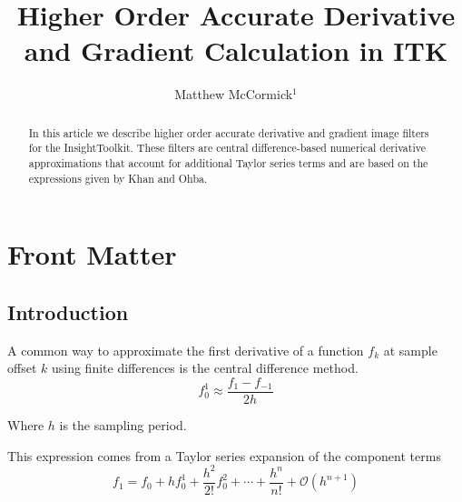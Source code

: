 \documentclass{InsightArticle}
\title{Higher Order Accurate Derivative and Gradient Calculation in ITK}
\author{Matthew McCormick$^{1}$}
\newcommand{\IJhandlerIDnumber}{9999}
\begin{document}
%
%
\IJhandlefooter{\IJhandlerIDnumber}


\ifpdf
\else
\fi


\maketitle


\ifhtml
\chapter*{Front Matter\label{front}}
\fi


\begin{abstract}
\noindent In this article we describe higher order accurate derivative and gradient
image filters for the InsightToolkit.  These filters are central difference-based
numerical derivative approximations that account for additional Taylor
series terms and are based on the expressions given by Khan and Ohba.
\end{abstract}

\IJhandlenote{\IJhandlerIDnumber}

\tableofcontents

\section{Introduction}

A common way to approximate the first derivative of a function $f_k$ at sample offset $k$ using
finite differences is the central difference method.
\begin{equation}
  f^1_0  \approx \frac{f_1 - f_{-1}} { 2 h }
\end{equation}

Where $h$ is the sampling period.

This expression comes from a Taylor series expansion of the component terms
\begin{equation}
  f_1 = f_0 + h f^1_0 + \frac{h^2}{2!}f^2_0 + \cdots + \frac{h^n}{n!} +
  \mathcal{O}(h^{n+1})
\end{equation}
\end{document}
